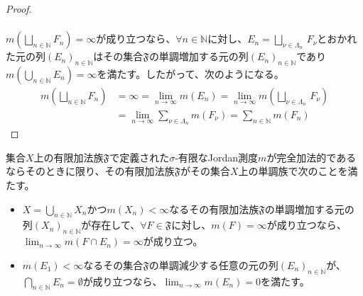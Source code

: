 \documentclass[dvipdfmx]{jsarticle}
\begin{document}
\begin{proof}
\begin{align*}
\end{align*}\par
$m\left( \bigsqcup_{n \in \mathbb{N}} F_{n} \right) = \infty$が成り立つなら、$\forall n \in \mathbb{N}$に対し、$E_{n} = \bigsqcup_{\nu \in \varLambda_{n}\mathbf{\ }} F_{\nu}$とおかれた元の列$\left( E_{n} \right)_{n \in \mathbb{N}}$はその集合$\mathfrak{F}$の単調増加する元の列$\left( E_{n} \right)_{n \in \mathbb{N}}$であり$m\left( \bigcup_{n \in \mathbb{N}} E_{n} \right) = \infty$を満たす。したがって、次のようになる。
\begin{align*}
m\left( \bigsqcup_{n \in \mathbb{N}} F_{n} \right) &= \infty = \lim_{n \rightarrow \infty}{m\left( E_{n} \right)} = \lim_{n \rightarrow \infty}{m\left( \bigsqcup_{\nu \in \varLambda_{n}\mathbf{\ }} F_{\nu} \right)}\\
&= \lim_{n \rightarrow \infty}{\sum_{\nu \in \varLambda_{n}} {m\left( F_{\nu} \right)}} = \sum_{n \in \mathbb{N}} {m\left( F_{n} \right)}
\end{align*}
\end{proof}
\begin{thm}\label{4.5.6.3}
集合$X$上の有限加法族$\mathfrak{F}$で定義された$\sigma$-有限なJordan測度$m$が完全加法的であるならそのときに限り、その有限加法族$\mathfrak{F}$がその集合$X$上の単調族で次のことを満たす。
\begin{itemize}
\item
  $X = \bigcup_{n \in \mathbb{N}} X_{n}$かつ$m\left( X_{n} \right) < \infty$なるその有限加法族$\mathfrak{F}$の単調増加する元の列$\left( X_{n} \right)_{n \in \mathbb{N}}$が存在して、$\forall F \in \mathfrak{F}$に対し、$m(F) = \infty$が成り立つなら、$\lim_{n \rightarrow \infty}{m\left( F \cap E_{n} \right)} = \infty$が成り立つ。
\item
  $m\left( E_{1} \right) < \infty$なるその集合$\mathfrak{F}$の単調減少する任意の元の列$\left( E_{n} \right)_{n \in \mathbb{N}}$が、$\bigcap_{n \in \mathbb{N}} E_{n} = \emptyset$が成り立つなら、$\lim_{n \rightarrow \infty}{m\left( E_{n} \right)} = 0$を満たす。
\end{itemize}
\end{thm}
\end{document}
